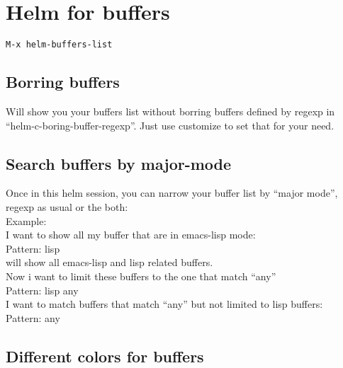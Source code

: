 \documentclass[a4paper,11pt]{article}
\begin{document}
\section{Helm for buffers}
\label{sec:helm-buffers}

\begin{verbatim}
M-x helm-buffers-list
\end{verbatim}

\subsection{Borring buffers}
\label{sec:borring-buffers}

Will show you your buffers list without borring buffers defined by regexp in
``helm-c-boring-buffer-regexp''.
Just use customize to set that for your need.\\

\subsection{Search buffers by major-mode}
\label{sec:search-buffers-major}


Once in this helm session, you can narrow your buffer list by ``major mode'', regexp as usual or the both:\\

Example:\\

I want to show all my buffer that are in emacs-lisp mode:\\

Pattern: lisp \\

will show all emacs-lisp and lisp related buffers.\\

Now i want to limit these buffers to the one that match ``any''\\

Pattern: lisp any \\
 
I want to match buffers that match ``any'' but not limited to lisp buffers:\\

Pattern: any \\

\subsection{Different colors for buffers}
\label{sec:diff-colors-buff}
\end{document}
